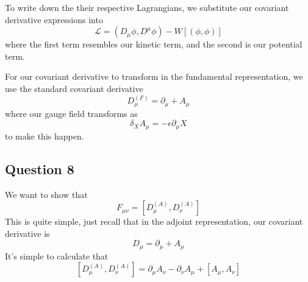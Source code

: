 To write down the their respective Lagrangians, 
we substitute our covariant derivative expressions 
into 
\[
	\mathcal{ L  }  = \left(  D _ \mu \phi , D ^ \mu \phi  \right)   - W \left[  \left(  
	\phi , \phi \right)  \right]  
\] where the first term resembles our kinetic term, 
and the second is our potential term. 

For our covariant derivative to transform in 
the fundamental representation, we use the standard 
covariant derivative 
\[
	D_{ \mu } ^{ \left(  F  \right)  }  = \partial _ \mu + A _ \mu 
\] where our gauge field transforms as 
\[
 \delta _ X A _ \mu  =  - \epsilon \partial  _ \mu X 
\] to make this happen.  

\pagebreak 

\subsection{Question 8} 
We want to show that 
\[
	F_{ \mu \nu }  = \left[  D _ \mu ^{ \left( A  \right)  }, D _ \nu ^{ \left(  A  \right) } \right] 
\] This is quite simple, 
just recall that in the adjoint representation, our 
covariant derivative is 
\[
 D _ \mu  = \partial  _ \mu  + A _ \mu 
\] It's simple to calculate that 
\[
	\left[  D _ \mu ^{ \left(  A  \right)  } , D _ \nu ^{ \left(  A  \right)  }  \right]  
	= \partial  _ \mu A _ \nu  - \partial  _ \nu A _ \mu + \left[  A _ \mu , A  _ \nu  \right] 
\] 
